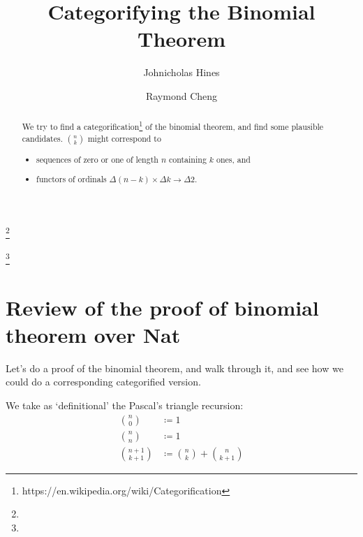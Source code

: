 \documentclass{proc-l}
\theoremstyle{definition}
\theoremstyle{remark}
\numberwithin{equation}{section}
\begin{document}
\title[Categorifying the Binomial Theorem]{Categorifying the Binomial Theorem}


\author{Johnicholas Hines}
\address{}
\curraddr{}
\email{}
\thanks{}

\author{Raymond Cheng}
\address{}
\curraddr{}
\email{}
\thanks{}


\date{}

\dedicatory{}

\commby{}

\begin{abstract}
We try to find a categorification\footnote{https://en.wikipedia.org/wiki/Categorification} of the binomial theorem,
and find some plausible candidates. \({n \choose k}\) might correspond to
\begin{itemize}
    \item sequences of zero or one of length \(n\) containing \(k\) ones, and
    \item functors of ordinals \(\Delta (n-k) \times \Delta k \to \Delta 2\).
\end{itemize} 
\end{abstract}

\maketitle

\section{Review of the proof of binomial theorem over Nat}

Let's do a proof of the binomial theorem, and walk through it,
and see how we could do a corresponding categorified version.

We take as `definitional' the Pascal's triangle recursion:
\begin{align*}
{n \choose 0} & \coloneqq 1 \\
{n \choose n} & \coloneqq 1 \\
{n + 1 \choose k + 1} & \coloneqq {n \choose k} + {n \choose k+1}
\end{align*}
\end{document}
